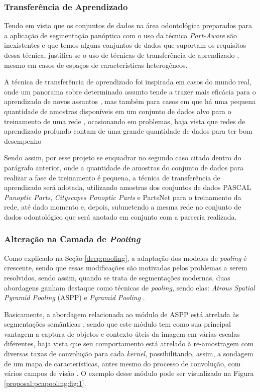\subsubsection{Transferência de Aprendizado}
\label{proposal:transf}
Tendo em vista que os conjuntos de dados na área odontológica preparados para a aplicação de segmentação panóptica com o uso da técnica \textit{Part-Aware} são inexistentes e que temos alguns conjuntos de dados que suportam os requisitos dessa técnica, justifica-se o uso de técnicas de transferência de aprendizado \cite{Weiss2016}, mesmo em casos de espaços de características heterogêneos.

A técnica de transferência de aprendizado foi inspirada em casos do mundo real, onde um panorama sobre determinado assunto tende a trazer mais eficácia para o aprendizado de novos assuntos \cite{Pan2010}, mas também para casos em que há uma pequena quantidade de amostras disponíveis em um conjunto de dados alvo para o treinamento de uma rede \cite{Weiss2016}, ocasionando em problemas, haja vista que redes de aprendizado profundo contam de uma grande quantidade de dados para ter bom desempenho \cite{Goodfellow2016}

Sendo assim, por esse projeto se enquadrar no segundo caso citado dentro do parágrafo anterior, onde a quantidade de amostras do conjunto de dados para realizar a fase de treinamento é pequena, a técnica de transferência de aprendizado será adotada, utilizando amostras dos conjuntos de dados PASCAL \textit{Panoptic Parts}, \textit{Cityscapes Panoptic Parts} e PartsNet para o treinamento da rede, até dado momento e, depois, submetendo a mesma rede no conjunto de dados odontológico que será anotado em conjunto com a parceria realizada.


\subsubsection{Alteração na Camada de \textit{Pooling}}
\label{proposal:pcapooling}
Como explicado na Seção \ref{deep:pooling}, a adaptação dos modelos de \textit{pooling} é crescente, sendo que essas modificações são motivadas pelos problemas a serem resolvidos, sendo assim, quando se trata de segmentações modernas, duas abordagens ganham destaque como técnicas de \textit{pooling}, sendo elas: \textit{Atrous Spatial Pyramid Pooling} (ASPP) \cite{Chen2018} e \textit{Pyramid Pooling} \cite{Zhao2017}.

Basicamente, a abordagem relacionada ao módulo de ASPP está atrelada às segmentações semânticas \cite{Mohan2020}, sendo que este módulo tem como sua principal vantagem a captura de objetos e contexto úteis da imagem em várias escalas diferentes, haja vista que seu comportamento está atrelado à re-amostragem com diversas taxas de convolução para cada \textit{kernel}, possibilitando, assim, a sondagem de um mapa de características, antes mesmo do processo de convolução, com vários campos de visão \cite{Chen2018}. O exemplo desse módulo pode ser visualizado na Figura \ref{proposal:pcapooling:fig:1}.


